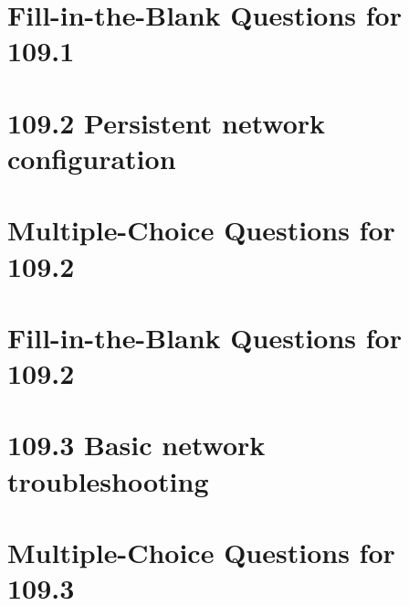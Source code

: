 \documentclass[a4paper]{report}
\begin{document}
\newpage
\section*{Fill-in-the-Blank Questions for 109.1}

\newpage
\section*{109.2 Persistent network configuration}

\newpage
\section*{Multiple-Choice Questions for 109.2}

\newpage
\section*{Fill-in-the-Blank Questions for 109.2}

\newpage
\section*{109.3 Basic network troubleshooting}

\newpage
\section*{Multiple-Choice Questions for 109.3}
\end{document}
